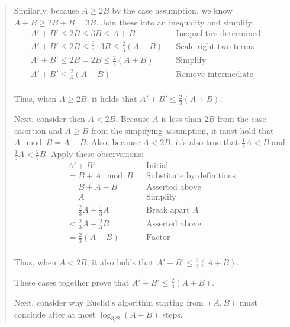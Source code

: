 \documentclass[11pt]{article}
\begin{document}
\begin{enumerate}[leftmargin=*]
\begin{enumerate}
\begin{quote}
        Similarly, because $A \geq 2B$ by the case assumption, we know $A + B \geq 2B + B = 3B$. Join these into an inequality and simplify:
        \begin{align*}
            && A' + B' \leq 2B \leq 3B \leq A + B && \text{Inequalities determined above} && \\
            && A' + B' \leq 2B \leq \frac{2}{3} \cdot 3B \leq \frac{2}{3}(A + B) && \text{Scale right two terms} && \\
            && A' + B' \leq 2B = 2B \leq \frac{2}{3}(A + B) && \text{Simplify} && \\
            && A' + B' \leq \frac{2}{3}(A + B) && \text{Remove intermediate terms} && \\
        \end{align*} 

        Thus, when $A \geq 2B$, it holds that $A' + B' \le \frac{2}{3}(A + B)$. 

        \medskip
        Next, consider then $A < 2B$. Because $A$ is less than $2B$ from the case assertion and $A \geq B$ from the simpifying assumption, it must hold that $A \mod B = A - B$. Also, because $A < 2B$, it's also true that $\frac{1}{2}A < B$ and $\frac{1}{3}A < \frac{2}{3}B$. Apply these observations: 
        \begin{align*}
            && A' + B' && \text{Initial} && \\
            && = B + A \mod B && \text{Substitute by definitions} && \\
            && = B + A - B && \text{Asserted above} && \\
            && = A && \text{Simplify} && \\
            && = \frac{2}{3}A + \frac{1}{3}A && \text{Break apart $A$} && \\
            && < \frac{2}{3}A + \frac{2}{3}B && \text{Asserted above} && \\
            && = \frac{2}{3}(A + B) && \text{Factor} && \\
        \end{align*} 

        Thus, when $A < 2B$, it also holds that $A' + B' \le \frac{2}{3}(A + B)$. 

        \medskip
        These cases together prove that $A' + B' \le \frac{2}{3}(A + B)$. 

        \medskip
        Next, consider why Euclid's algorithm starting from $(A, B)$ must conclude after at most $\log_{3/2}(A+B)$ steps. 


\end{quote}
\end{enumerate}
\end{enumerate}
\end{document}
